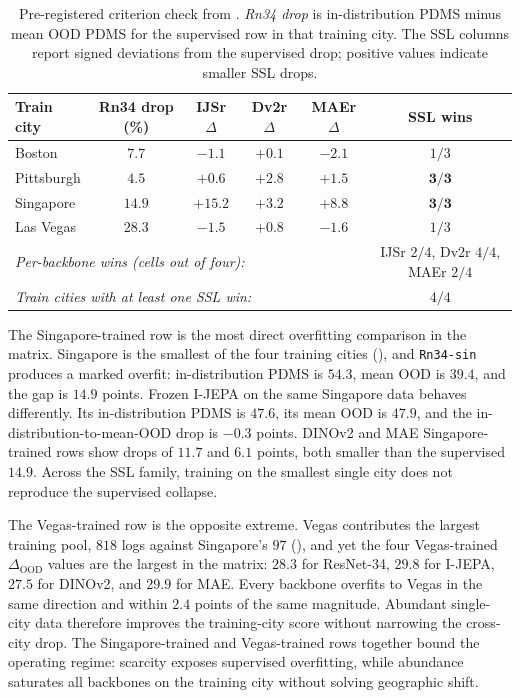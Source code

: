 \begin{table}[ht]
\centering
\caption[Pre-registered criterion check.]{Pre-registered criterion check from . \emph{Rn34 drop} is in-distribution PDMS minus mean OOD PDMS for the supervised row in that training city. The SSL columns report signed deviations from the supervised drop; positive values indicate smaller SSL drops.}
\label{tab:dd-cc-criterion}
\small
\renewcommand{\arraystretch}{1.15}
\setlength{\tabcolsep}{6pt}
\begin{tabular}{@{}l c c c c c@{}}
\toprule
\textbf{Train city} & \textbf{Rn34 drop (\%)} & \textbf{IJSr $\Delta$} & \textbf{Dv2r $\Delta$} & \textbf{MAEr $\Delta$} & \textbf{SSL wins} \\
\midrule
Boston      & $7.7$  & $-1.1$           & $+0.1$           & $-2.1$           & $1/3$ \\
Pittsburgh  & $4.5$  & $\mathbf{+0.6}$  & $\mathbf{+2.8}$  & $\mathbf{+1.5}$  & $\mathbf{3/3}$ \\
Singapore   & $14.9$ & $\mathbf{+15.2}$ & $\mathbf{+3.2}$  & $\mathbf{+8.8}$  & $\mathbf{3/3}$ \\
Las Vegas   & $28.3$ & $-1.5$           & $+0.8$           & $-1.6$           & $1/3$ \\
\midrule
\multicolumn{5}{l}{\emph{Per-backbone wins (cells out of four):}} & IJSr $2/4$, Dv2r $4/4$, MAEr $2/4$ \\
\multicolumn{5}{l}{\emph{Train cities with at least one SSL win:}} & $4/4$ \\
\bottomrule
\end{tabular}
\end{table}

The Singapore-trained row is the most direct overfitting comparison in the matrix. Singapore is the smallest of the four training cities (), and \texttt{Rn34-sin} produces a marked overfit: in-distribution PDMS is $54.3$, mean OOD is $39.4$, and the gap is $14.9$ points. Frozen I-JEPA on the same Singapore data behaves differently. Its in-distribution PDMS is $47.6$, its mean OOD is $47.9$, and the in-distribution-to-mean-OOD drop is $-0.3$ points. DINOv2 and MAE Singapore-trained rows show drops of $11.7$ and $6.1$ points, both smaller than the supervised $14.9$. Across the SSL family, training on the smallest single city does not reproduce the supervised collapse.

The Vegas-trained row is the opposite extreme. Vegas contributes the largest training pool, $818$ logs against Singapore's $97$ (), and yet the four Vegas-trained $\Delta_\text{OOD}$ values are the largest in the matrix: $28.3$ for ResNet-34, $29.8$ for I-JEPA, $27.5$ for DINOv2, and $29.9$ for MAE. Every backbone overfits to Vegas in the same direction and within $2.4$ points of the same magnitude. Abundant single-city data therefore improves the training-city score without narrowing the cross-city drop. The Singapore-trained and Vegas-trained rows together bound the operating regime: scarcity exposes supervised overfitting, while abundance saturates all backbones on the training city without solving geographic shift.

